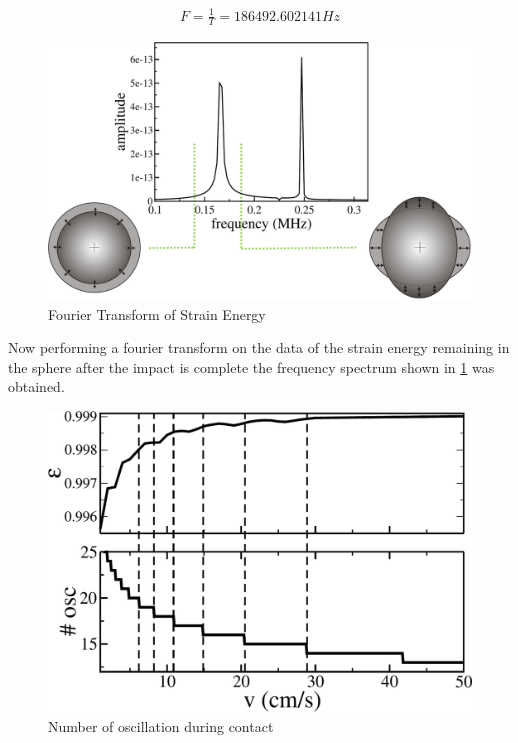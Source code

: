\begin{align}
F = \frac{1}{T} = 186492.602141Hz
\end{align}

\begin{figure}[H]
\includegraphics[scale=0.5]{../images/fft/spectrummodes.png}
\caption{Fourier Transform of Strain Energy}
\label{fig:spectrum}
\end{figure}

Now performing a fourier transform on the data of the strain energy remaining in the sphere after the impact is complete the frequency spectrum shown in \ref{fig:spectrum} was obtained.

\begin{figure}[H]
\includegraphics[scale=0.5]{../images/fft/oscillations.png}
\caption{Number of oscillation during contact}
\label{fig:oscillations}
\end{figure}

